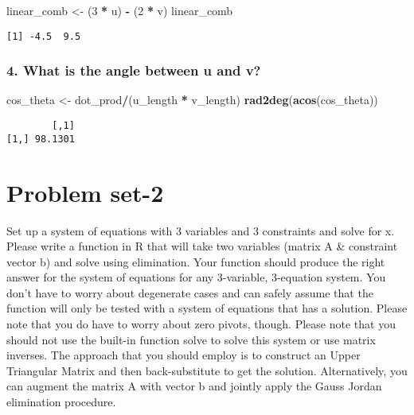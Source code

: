 \documentclass[]{article}
\newenvironment{Shaded}{\begin{snugshade}}{\end{snugshade}}
\newcommand{\DecValTok}[1]{\textcolor[rgb]{0.00,0.00,0.81}{#1}}
\newcommand{\KeywordTok}[1]{\textcolor[rgb]{0.13,0.29,0.53}{\textbf{#1}}}
\newcommand{\NormalTok}[1]{#1}
\newcommand{\OperatorTok}[1]{\textcolor[rgb]{0.81,0.36,0.00}{\textbf{#1}}}
\newcommand{\StringTok}[1]{\textcolor[rgb]{0.31,0.60,0.02}{#1}}
\begin{document}
\begin{Shaded}
\begin{Highlighting}[]
\NormalTok{linear_comb <-}\StringTok{ }\NormalTok{(}\DecValTok{3} \OperatorTok{*}\StringTok{ }\NormalTok{u) }\OperatorTok{-}\StringTok{ }\NormalTok{(}\DecValTok{2} \OperatorTok{*}\StringTok{ }\NormalTok{v)}
\NormalTok{linear_comb}
\end{Highlighting}
\end{Shaded}

\begin{verbatim}
[1] -4.5  9.5
\end{verbatim}

\hypertarget{what-is-the-angle-between-u-and-v}{%
\subsubsection{4. What is the angle between u and
v?}\label{what-is-the-angle-between-u-and-v}}

\begin{Shaded}
\begin{Highlighting}[]
\NormalTok{cos_theta <-}\StringTok{ }\NormalTok{dot_prod}\OperatorTok{/}\NormalTok{(u_length }\OperatorTok{*}\StringTok{ }\NormalTok{v_length)}
\KeywordTok{rad2deg}\NormalTok{(}\KeywordTok{acos}\NormalTok{(cos_theta))}
\end{Highlighting}
\end{Shaded}

\begin{verbatim}
        [,1]
[1,] 98.1301
\end{verbatim}

\hypertarget{problem-set-2}{%
\section{Problem set-2}\label{problem-set-2}}

Set up a system of equations with 3 variables and 3 constraints and
solve for x. Please write a function in R that will take two variables
(matrix A \& constraint vector b) and solve using elimination. Your
function should produce the right answer for the system of equations for
any 3-variable, 3-equation system. You don't have to worry about
degenerate cases and can safely assume that the function will only be
tested with a system of equations that has a solution. Please note that
you do have to worry about zero pivots, though. Please note that you
should not use the built-in function solve to solve this system or use
matrix inverses. The approach that you should employ is to construct an
Upper Triangular Matrix and then back-substitute to get the solution.
Alternatively, you can augment the matrix A with vector b and jointly
apply the Gauss Jordan elimination procedure.
\end{document}
